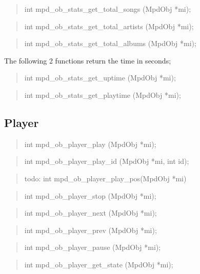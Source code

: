 \documentclass[a4paper,11pt]{article}
\begin{document}
	\begin{quote}
	int  mpd\_ob\_stats\_get\_total\_songs  (MpdObj *mi);
	\end{quote}
	
	\begin{quote}
	int  mpd\_ob\_stats\_get\_total\_artists  (MpdObj *mi);
	\end{quote}
	
	\begin{quote}
	int  mpd\_ob\_stats\_get\_total\_albums  (MpdObj *mi);
	\end{quote}
	
	The following 2 functions return the time in seconds;
	\begin{quote}
	int  mpd\_ob\_stats\_get\_uptime   (MpdObj *mi);
	\end{quote}
	\begin{quote}
	int  mpd\_ob\_stats\_get\_playtime  (MpdObj *mi);
	\end{quote}
	
	\subsection{Player}
	\begin{quote}
	int   mpd\_ob\_player\_play   (MpdObj *mi);
	\end{quote}
	\begin{quote}
	int   mpd\_ob\_player\_play\_id   (MpdObj *mi, int id);
	\end{quote}
	
	\begin{quote}
	todo: int mpd\_ob\_player\_play\_pos(MpdObj *mi)
	\end{quote}
	
	\begin{quote}
	int   mpd\_ob\_player\_stop   (MpdObj *mi);
	\end{quote}
	
	\begin{quote}
	int   mpd\_ob\_player\_next   (MpdObj *mi);
	\end{quote}
	
	\begin{quote}
	int   mpd\_ob\_player\_prev   (MpdObj *mi);
	\end{quote}
	
	\begin{quote}
	int   mpd\_ob\_player\_pause   (MpdObj *mi);
	\end{quote}
	
	\begin{quote}
	int   mpd\_ob\_player\_get\_state   (MpdObj *mi);
	\end{quote}
	
\end{document}
